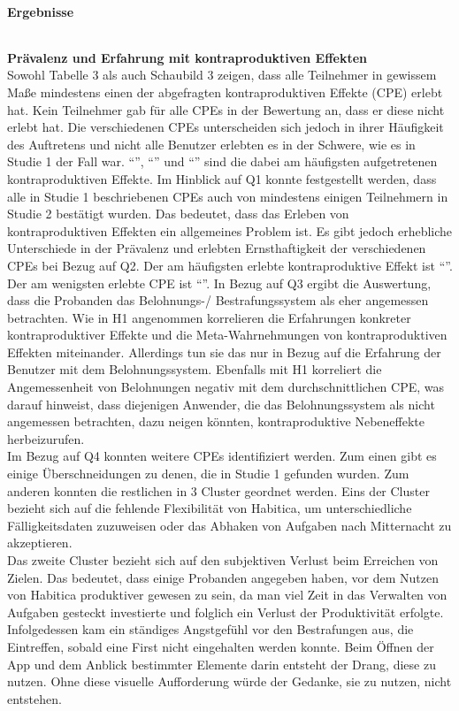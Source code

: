 \documentclass[sigconf, nonacm]{acmart}
\begin{document}
\paragraph{Ergebnisse}$~$

\textbf{Prävalenz und Erfahrung mit kontraproduktiven Effekten}
\\
Sowohl Tabelle 3 als auch Schaubild 3 zeigen, dass alle Teilnehmer in gewissem Maße mindestens einen der abgefragten kontraproduktiven Effekte (CPE) erlebt hat. Kein Teilnehmer gab für alle CPEs in der Bewertung an, dass er diese nicht erlebt hat. Die verschiedenen CPEs unterscheiden sich jedoch in ihrer Häufigkeit des Auftretens und nicht alle Benutzer erlebten es in der Schwere, wie es in Studie 1 der Fall war. \enquote{}, \enquote{} und \enquote{} sind die dabei am häufigsten aufgetretenen kontraproduktiven Effekte. 
Im Hinblick auf Q1 konnte festgestellt werden, dass alle in Studie 1 beschriebenen CPEs auch von mindestens einigen Teilnehmern in Studie 2 bestätigt wurden. Das bedeutet, dass das Erleben von kontraproduktiven Effekten ein allgemeines Problem ist. Es gibt jedoch erhebliche Unterschiede in der Prävalenz und erlebten Ernsthaftigkeit der verschiedenen CPEs bei Bezug auf Q2. Der am häufigsten erlebte kontraproduktive Effekt ist \enquote{}. Der am wenigsten erlebte CPE ist \enquote{}. In Bezug auf Q3 ergibt die Auswertung, dass die Probanden das Belohnungs-/ Bestrafungssystem als eher angemessen betrachten. 
Wie in H1 angenommen korrelieren die Erfahrungen konkreter kontraproduktiver Effekte und die Meta-Wahrnehmungen von kontraproduktiven Effekten miteinander. Allerdings tun sie das nur in Bezug auf die Erfahrung der Benutzer mit dem Belohnungssystem. Ebenfalls mit H1 korreliert die Angemessenheit von Belohnungen negativ mit dem durchschnittlichen CPE, was darauf hinweist, dass diejenigen Anwender, die das Belohnungssystem als nicht angemessen betrachten, dazu neigen könnten, kontraproduktive Nebeneffekte herbeizurufen. 
\\
Im Bezug auf Q4 konnten weitere CPEs identifiziert werden. Zum einen gibt es einige Überschneidungen zu denen, die in Studie 1 gefunden wurden. Zum anderen konnten die restlichen in 3 Cluster geordnet werden. 
Eins der Cluster bezieht sich auf die fehlende Flexibilität von Habitica, um unterschiedliche Fälligkeitsdaten zuzuweisen oder das Abhaken von Aufgaben nach Mitternacht zu akzeptieren. 
\\
Das zweite Cluster bezieht sich auf den subjektiven Verlust beim Erreichen von Zielen. Das bedeutet, dass einige Probanden angegeben haben, vor dem Nutzen von Habitica produktiver gewesen zu sein, da man viel Zeit in das Verwalten von Aufgaben gesteckt investierte und folglich ein Verlust der Produktivität erfolgte. Infolgedessen kam ein ständiges Angstgefühl vor den Bestrafungen aus, die Eintreffen, sobald eine First nicht eingehalten werden konnte. Beim Öffnen der App und dem Anblick bestimmter Elemente darin entsteht der Drang, diese zu nutzen. Ohne diese visuelle Aufforderung würde der Gedanke, sie zu nutzen, nicht entstehen.
\end{document}
